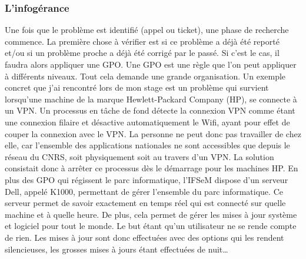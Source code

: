 \subsubsection{L'infogérance}
Une fois que le problème est identifié (appel ou ticket), une phase de recherche commence. La première chose à vérifier est si ce problème a déjà été reporté et/ou si un problème proche a déjà été corrigé par le passé. Si c'est le cas, il faudra alors appliquer une GPO. Une GPO est une règle que l'on peut appliquer à différents niveaux. Tout cela demande une grande organisation. 
\medbreak
Un exemple concret que j'ai rencontré lors de mon stage est un problème qui survient lorsqu'une machine de la marque Hewlett-Packard Company (HP), se connecte à un VPN. Un processus en tâche de fond détecte la connexion VPN comme étant une connexion filaire et désactive automatiquement le Wifi, ayant pour effet de couper la connexion avec le VPN. La personne ne peut donc pas travailler de chez elle, car l'ensemble des applications nationales ne sont accessibles que depuis le réseau du CNRS, soit physiquement soit au travers d'un VPN. La solution consistait donc à arrêter ce processus dès le démarrage pour les machines HP.
\medbreak
En plus des GPO qui régissent le parc informatique, l'IFSeM dispose d'un serveur Dell, appelé K1000, permettant de gérer l'ensemble du parc informatique. Ce serveur permet de savoir exactement en temps réel qui est connecté sur quelle machine et à quelle heure. De plus, cela permet de gérer les mises à jour système et logiciel pour tout le monde. Le but étant qu'un utilisateur ne se rende compte de rien. Les mises à jour sont donc effectuées avec des options qui les rendent silencieuses, les grosses mises à jours étant effectuées de nuit\dots 

